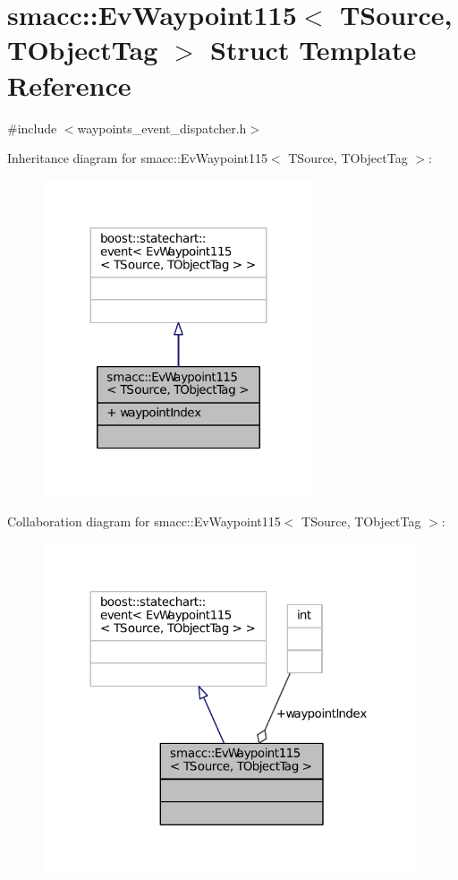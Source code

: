 \hypertarget{structsmacc_1_1EvWaypoint115}{}\section{smacc\+:\+:Ev\+Waypoint115$<$ T\+Source, T\+Object\+Tag $>$ Struct Template Reference}
\label{structsmacc_1_1EvWaypoint115}


{\ttfamily \#include $<$waypoints\+\_\+event\+\_\+dispatcher.\+h$>$}



Inheritance diagram for smacc\+:\+:Ev\+Waypoint115$<$ T\+Source, T\+Object\+Tag $>$\+:
\nopagebreak
\begin{figure}[H]
\begin{center}
\leavevmode
\includegraphics[width=227pt]{structsmacc_1_1EvWaypoint115__inherit__graph}
\end{center}
\end{figure}


Collaboration diagram for smacc\+:\+:Ev\+Waypoint115$<$ T\+Source, T\+Object\+Tag $>$\+:
\nopagebreak
\begin{figure}[H]
\begin{center}
\leavevmode
\includegraphics[width=312pt]{structsmacc_1_1EvWaypoint115__coll__graph}
\end{center}
\end{figure}
